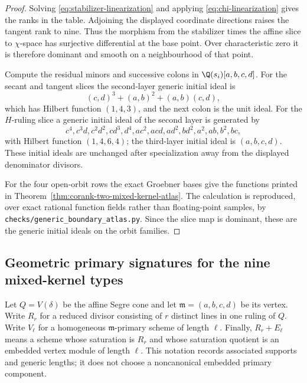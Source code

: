\begin{proof}
Solving \eqref{eq:stabilizer-linearization} and applying
\eqref{eq:chi-linearization} gives the ranks in the table.  Adjoining
the displayed coordinate directions raises the tangent rank to nine.
Thus the morphism from the stabilizer times the affine slice to
\(\chi\)-space has surjective differential at the base point.
Over characteristic zero it is therefore dominant and smooth on a
neighbourhood of that point.

Compute the residual minors and successive colons in
\(\Q(s_i)[a,b,c,d]\).  For the secant and tangent slices the
second-layer generic initial ideal is
\[
 (c,d)^3+(a,b)^2+(a,b)(c,d),
\]
which has Hilbert function \((1,4,3)\), and the next colon is the
unit ideal.  For the \(H\)-ruling slice a generic initial ideal of
the second layer is generated by
\[
 c^4,c^3d,c^2d^2,cd^3,d^4,
 ac^2,acd,ad^2,bd^2,a^2,ab,b^2,bc,
\]
with Hilbert function \((1,4,6,4)\); the third-layer initial ideal
is \((a,b,c,d)\).  These initial ideals are unchanged after
specialization away from the displayed denominator divisors.

For the four open-orbit rows the exact Groebner bases give the
functions printed in Theorem~\ref{thm:corank-two-mixed-kernel-atlas}.
The calculation is reproduced, over exact rational function fields
rather than floating-point samples, by
\texttt{checks/generic\_boundary\_atlas.py}.  Since the slice map
is dominant, these are the generic initial ideals on the orbit
families.
\end{proof}

\subsection{Geometric primary signatures for the nine mixed-kernel types}

Let \(Q=V(\delta)\) be the affine Segre cone and let
\(\mathfrak m=(a,b,c,d)\) be its vertex.  Write \(R_r\) for a
reduced divisor consisting of \(r\) distinct lines in one ruling of
\(Q\).  Write \(V_\ell\) for a homogeneous
\(\mathfrak m\)-primary scheme of length \(\ell\).  Finally,
\(R_r+E_\ell\) means a scheme whose saturation is \(R_r\) and
whose saturation quotient is an embedded vertex module of length
\(\ell\).  This notation records associated supports and generic
lengths; it does not choose a noncanonical embedded primary
component.

